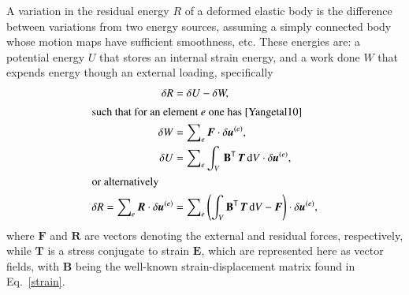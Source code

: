 A variation in the residual energy $R$ of a deformed elastic body is the difference between variations from two energy sources, assuming a simply connected body whose motion maps have sufficient smoothness, etc.  These energies are: a potential energy $U$ that stores an internal strain energy, and a work done $W$ that expends energy though an external loading, specifically
\begin{subequations}
    \label{principle}
    \begin{align}
    \delta{R} &= \delta{U} - \delta{W} , \\
    \intertext{such that for an element $e$ one has \cite{Yangetal10}}
    \delta{W} & = \sum\nolimits_e \boldsymbol{F} \cdot \delta\boldsymbol{u}^{(e)} , \\
    \delta{U} & = \sum\nolimits_e \int_{V} \, \mathbf{B}^{\mathsf{T}} \,
    \boldsymbol{T} \, \mathrm{d} V \cdot \delta\boldsymbol{u}^{(e)} , \\
    \intertext{or alternatively}
    \delta R = \sum\nolimits_e \boldsymbol{R} \cdot \delta \boldsymbol{u}^{(e)} & = 
    \sum\nolimits_e \left( \int_V \mathbf{B}^{\mathsf{T}} \, \boldsymbol{T} \, \mathrm{d}V - 
    \boldsymbol{F} \right) \cdot \delta \boldsymbol{u}^{(e)}  ,
    \label{residualVariation}
    \end{align}
\end{subequations}
where $\boldsymbol{F}$ and $\boldsymbol{R}$ are vectors denoting the external and residual forces, respectively, while $\boldsymbol{T}$ is a stress conjugate to strain $\boldsymbol{E}$, which are represented here as vector fields, with $\mathbf{B}$ being the well-known strain-displacement matrix found in Eq.~\ref{strain}.

